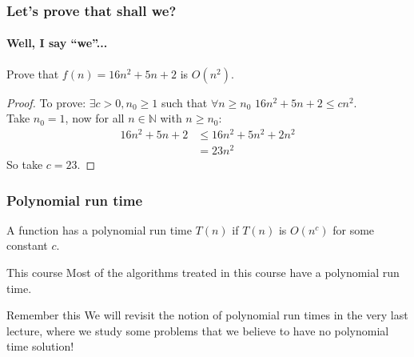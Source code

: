 \begin{frame}
	\frametitle{Let's prove that shall we?}
	\framesubtitle{Well, I say ``we''...}

	\begin{block}{}
		Prove that $f(n) = 16n^2 + 5n + 2$ is $O(n^2)$.
	\end{block}
	\pause
	\begin{proof}
		To prove: $\exists c > 0, n_0 \geq 1$ such that $\forall n \geq n_0$ $16n^2 + 5n + 2 \leq cn^2$.\\
		\pause
		Take $n_0 = 1$, now for all $n \in \mathbb{N}$ with $n \geq n_0$:
		\begin{align*}
			16n^2 + 5n + 2 &\leq 16n^2 + 5n^2 + 2n^2 \\
										 &= 23n^2
		\end{align*}
		So take $c=23$.
	\end{proof}
\end{frame}

\begin{frame}
	\frametitle{Polynomial run time}
	
	\begin{definition}
		A function has a polynomial run time $T(n)$ if $T(n)$ is $O(n^c)$ for some constant $c$.	
	\end{definition}
	\pause
	\begin{exampleblock}{This course}
		Most of the algorithms treated in this course have a polynomial run time.
	\end{exampleblock}	

	\pause
	\begin{alertblock}{Remember this}
		We will revisit the notion of polynomial run times in the very last lecture, where we study some problems that
		we believe to have no polynomial time solution!
	\end{alertblock}	
\end{frame}

